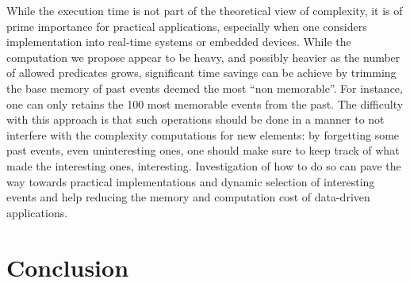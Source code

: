 \documentclass[conference]{IEEEtran}
\begin{document}
While the execution time is not part of the theoretical view of complexity, it
is of prime importance for practical applications, especially when one considers
implementation into real-time systems or embedded devices. While the computation
we propose appear to be heavy, and possibly heavier as the number of allowed
predicates grows, significant time savings can be achieve by trimming the base
memory of past events deemed the most ``non memorable''. For instance, one can
only retains the 100 most memorable events from the past. The difficulty with
this approach is that such operations should be done in a manner to not
interfere with the complexity computations for new elements: by forgetting some
past events, even uninteresting ones, one should make sure to keep track of what
made the interesting ones, interesting. Investigation of how to do so can pave
the way towards practical implementations and dynamic selection of interesting
events and help reducing the memory and computation cost of data-driven applications.


\section{Conclusion}




\end{document}
